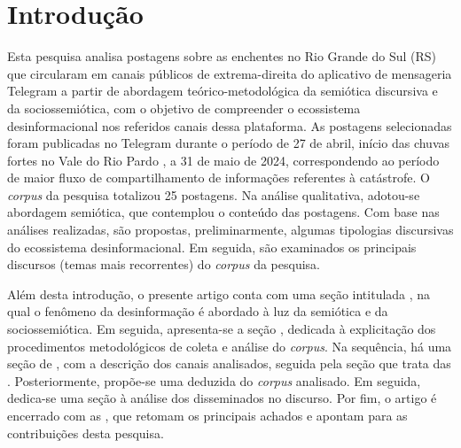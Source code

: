 \documentclass[portuguese]{textolivre}
\begin{document}
\begin{polyabstract}
\begin{english}
\begin{abstract}
\end{abstract}
\end{english}
\end{polyabstract}

\section{Introdução}
Esta pesquisa analisa postagens sobre as enchentes no Rio Grande do Sul (RS) que circularam em canais públicos de extrema-direita do aplicativo de mensageria Telegram a partir de abordagem teórico-metodológica da semiótica discursiva e da sociossemiótica, com o objetivo de compreender o ecossistema desinformacional nos referidos canais dessa plataforma. As postagens selecionadas foram publicadas no Telegram durante o período de 27 de abril, início das chuvas fortes no Vale do Rio Pardo \cite{bbc2024inundacoes}, a 31 de maio de 2024, correspondendo ao período de maior fluxo de compartilhamento de informações referentes à catástrofe. O \textit{corpus} da pesquisa totalizou 25 postagens. Na análise qualitativa, adotou-se abordagem semiótica, que contemplou o conteúdo das postagens. Com base nas análises realizadas, são propostas, preliminarmente, algumas tipologias discursivas do ecossistema desinformacional. Em seguida, são examinados os principais discursos (temas mais recorrentes) do \textit{corpus} da pesquisa. 

Além desta introdução, o presente artigo conta com uma seção intitulada , na qual o fenômeno da desinformação é abordado à luz da semiótica e da sociossemiótica. Em seguida, apresenta-se a seção , dedicada à explicitação dos procedimentos metodológicos de coleta e análise do \textit{corpus}. Na sequência, há uma seção de , com a descrição dos canais analisados, seguida pela seção que trata das . Posteriormente, propõe-se uma  deduzida do \textit{corpus} analisado. Em seguida, dedica-se uma seção à análise dos  disseminados no discurso. Por fim, o artigo é encerrado com as , que retomam os principais achados e apontam para as contribuições desta pesquisa.
\end{document}
